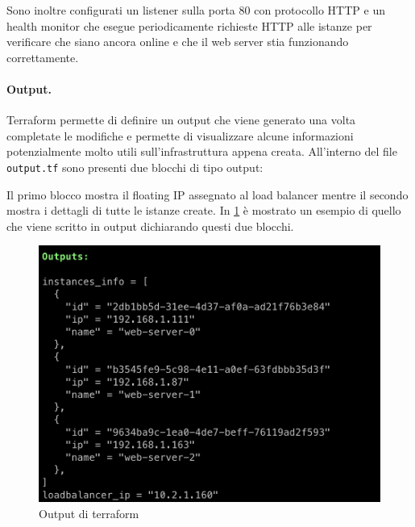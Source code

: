Sono inoltre configurati un listener sulla porta 80 con protocollo HTTP e un health monitor che esegue periodicamente richieste HTTP alle istanze per verificare che siano ancora online e che il web server stia funzionando correttamente.

\paragraph{Output.}

Terraform permette di definire un output che viene generato una volta completate le modifiche e permette di visualizzare alcune informazioni potenzialmente molto utili sull'infrastruttura appena creata. All'interno del file \verb|output.tf| sono presenti due blocchi di tipo output:

\noindent
Il primo blocco mostra il floating IP assegnato al load balancer mentre il secondo mostra i dettagli di tutte le istanze create. In \cref{fig:terraform_project3_output} è mostrato un esempio di quello che viene scritto in output dichiarando questi due blocchi.

\begin{figure}[H]
    \center
    \includegraphics[scale=0.6]{tesi/files/immagini/terraform/projects/project3_output.png}
    \caption{Output di terraform}
    \label{fig:terraform_project3_output}
\end{figure}
